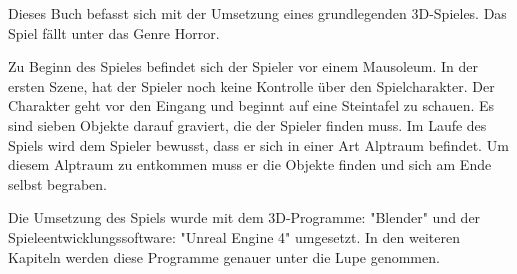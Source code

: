Dieses Buch befasst sich mit der Umsetzung eines grundlegenden 3D-Spieles.
Das Spiel fällt unter das Genre Horror.

Zu Beginn des Spieles befindet sich der Spieler vor einem Mausoleum.
In der ersten Szene, hat der Spieler noch keine Kontrolle über den Spielcharakter.
Der Charakter geht vor den Eingang und beginnt auf eine Steintafel zu schauen.
Es sind sieben Objekte darauf graviert, die der Spieler finden muss.
Im Laufe des Spiels wird dem Spieler bewusst, dass er sich in einer Art Alptraum befindet.
Um diesem Alptraum zu entkommen muss er die Objekte finden und sich am Ende selbst begraben.

Die Umsetzung des Spiels wurde mit dem 3D-Programme: "Blender" und der Spieleentwicklungssoftware: "Unreal Engine 4" umgesetzt.
In den weiteren Kapiteln werden diese Programme genauer unter die Lupe genommen.